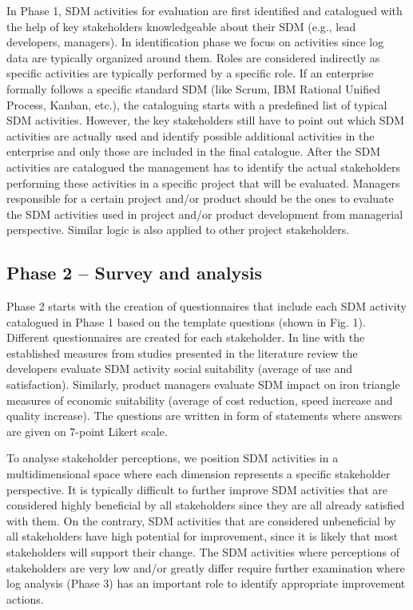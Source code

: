 In Phase 1, SDM activities for evaluation are first identified and catalogued with the help of
key stakeholders knowledgeable about their SDM (e.g., lead developers, managers). In identification
phase we focus on activities since log data are typically organized around them. Roles are considered
indirectly as specific activities are typically performed by a specific role. If an enterprise formally
follows a specific standard SDM (like Scrum, IBM Rational Unified Process, Kanban, etc.), the
cataloguing starts with a predefined list of typical SDM activities. However, the key stakeholders still
have to point out which SDM activities are actually used and identify possible additional activities in
the enterprise and only those are included in the final catalogue. After the SDM activities are
catalogued the management has to identify the actual stakeholders performing these activities in a
specific project that will be evaluated. Managers responsible for a certain project and/or product
should be the ones to evaluate the SDM activities used in project and/or product development from
managerial perspective. Similar logic is also applied to other project stakeholders.

\subsection{Phase 2 – Survey and analysis}
Phase 2 starts with the creation of questionnaires that include each SDM activity catalogued
in Phase 1 based on the template questions (shown in Fig. 1). Different questionnaires are created
for each stakeholder. In line with the established measures from studies presented in the literature
review the developers evaluate SDM activity social suitability (average of use and satisfaction).
Similarly, product managers evaluate SDM impact on iron triangle measures of economic suitability
(average of cost reduction, speed increase and quality increase). The questions are written in form of
statements where answers are given on 7-point Likert scale.

To analyse stakeholder perceptions, we position SDM activities in a multidimensional space
where each dimension represents a specific stakeholder perspective. It is typically difficult to further
improve SDM activities that are considered highly beneficial by all stakeholders since they are all already satisfied with them. On the contrary, SDM activities that are considered unbeneficial by all
stakeholders have high potential for improvement, since it is likely that most stakeholders will
support their change. The SDM activities where perceptions of stakeholders are very low and/or
greatly differ require further examination where log analysis (Phase 3) has an important role to
identify appropriate improvement actions.


